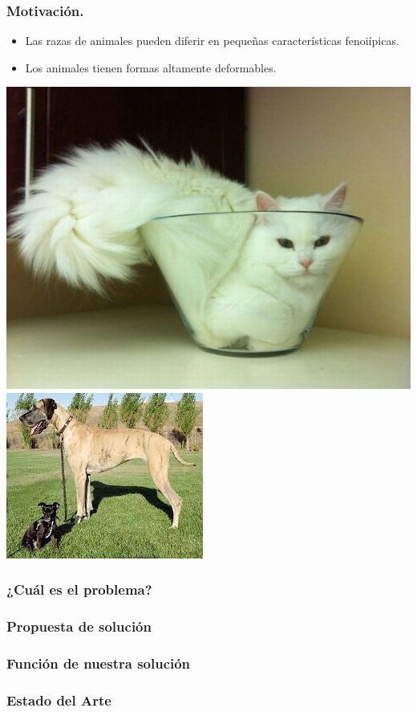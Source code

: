 \documentclass{beamer}
\begin{document}
	\begin{frame}
		\frametitle{Motivaci\'on.}
		\begin{itemize}
			\item{
				Las razas de animales pueden diferir en pequeñas características fenoiípicas.
			}
			\item{
				Los animales tienen formas altamente deformables.
			}
		\end{itemize}
		{\includegraphics[scale=0.2]{imagen/fitsisits.jpg}}
		{\includegraphics[scale=0.5]{imagen/dogdiff.jpg}}
	\end{frame}
	\begin{frame}
		\frametitle{¿Cuál es el problema?}
	\end{frame}
	\begin{frame}
		\frametitle{Propuesta de solución}
	\end{frame}
	\begin{frame}
		\frametitle{Función de nuestra solución}
	\end{frame}
	\begin{frame}
		\frametitle{Estado del Arte}
	\end{frame}
\end{document}

